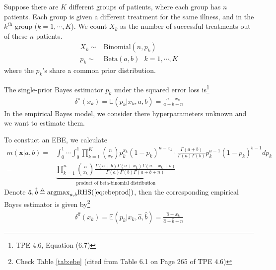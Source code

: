 \begin{example}
    Suppose there are $K$ different groups of patients,
    where each group has $n$ patients.
    Each group is given a different treatment for the same illness,
    and in the $k^{\text{th}}$ group ($k=1,\cdots,K$).
    We count $X_k$ as the number of successful treatments out of these $n$ patients.
    \begin{align}
        X_k\sim&\text{Binomial}(n,p_k)\\
        p_k\sim&\text{Beta}(a,b)~~~k=1,\cdots,K
    \end{align}
    where the $p_k$'s share a common prior distribution.

    The single-prior Bayes estimator $p_k$ under the squared error loss is\footnote{TPE 4.6, Equation (6.7)}
    \begin{gather}
        \delta^\pi(x_k)=\mathbb{E}(p_k|x_k,a,b)=\frac{a+x_n}{a+b+n}\label{eq:ebe1}
    \end{gather}
    In the empirical Bayes model,
    we consider there hyperparameters unknown and we want to estimate them.

    To constuct an EBE, we calculate 
    \begin{align}
        m(\boldsymbol{x}|a,b)
        =& \int_0^1\cdots\int_0^1\prod_{k=1}^K\binom{n}{x_k}p_k^{x_k}(1-p_k)^{n-x_k}
        \cdot \frac{\Gamma(a+b)}{\Gamma(a)\Gamma(b)}p_k^{a-1}(1-p_k)^{b-1} dp_k\\
        =& \underbrace{\prod_{k=1}^n\binom{n}{x_k}
        \frac{\Gamma(a+b)\Gamma(a+x_k)\Gamma(n-x_k+b)}
        {\Gamma(a)\Gamma(b)\Gamma(a+b+n)}}_{\text{product of beta-binomial distribution}}\label{eq:ebeprod}
    \end{align}
    Denote $\hat{a},\hat{b}\triangleq\mathrm{argmax}_{a,b}\text{RHS(\ref{eq:ebeprod})}$, 
    then the corresponding empirical Bayes estimator is given by\footnote{
    Check Table \ref{tab:ebe} (cited from Table 6.1 on Page 265 of TPE 4.6)
    }
    \begin{gather}
        \delta^{\hat{\pi}}(x_k)=\mathbb{E}(p_k|x_k,\hat{a},\hat{b})=\frac{\hat{a}+x_k}{\hat{a}+\hat{b}+n}\label{eq:ebe2}
    \end{gather}
\end{example}

